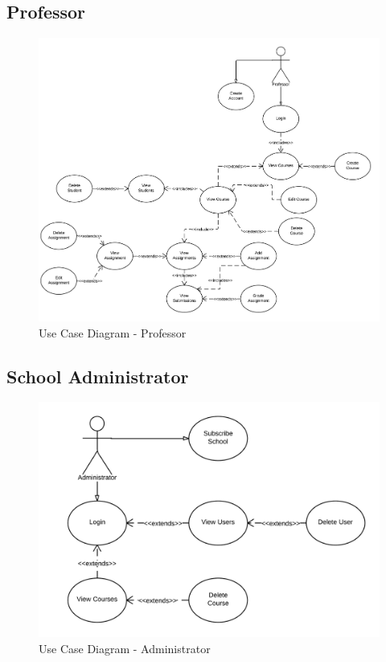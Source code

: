 \subsection*{Professor}
\begin{figure}[H]
	\centering
	\includegraphics[width=\textwidth]{img/useCaseProf}
	\caption{Use Case Diagram - Professor}
\end{figure}

\subsection*{School Administrator}

\begin{figure}[H]
	\centering
	\includegraphics[width=\textwidth]{img/useCaseAdmin}
	\caption{Use Case Diagram - Administrator}
\end{figure}
\clearpage
{}
\label{sec:useCases}
